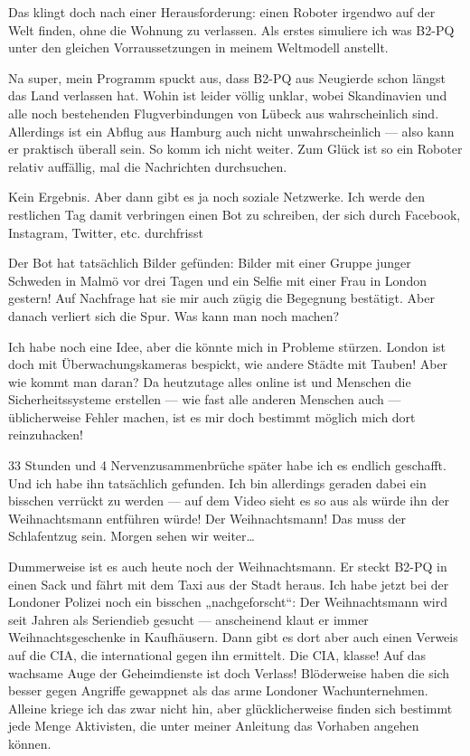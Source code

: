 Das klingt doch nach einer Herausforderung: einen Roboter irgendwo auf der Welt finden, ohne die Wohnung zu verlassen. Als erstes simuliere ich was B2-PQ unter den gleichen Vorraussetzungen in meinem Weltmodell anstellt.

Na super, mein Programm spuckt aus, dass B2-PQ aus Neugierde schon längst das Land verlassen hat. Wohin ist leider völlig unklar, wobei Skandinavien und alle noch bestehenden Flugverbindungen von Lübeck aus wahrscheinlich sind. Allerdings ist ein Abflug aus Hamburg auch nicht unwahrscheinlich — also kann er praktisch überall sein. So komm ich nicht weiter. Zum Glück ist so ein Roboter relativ auffällig, mal die Nachrichten durchsuchen.

Kein Ergebnis. Aber dann gibt es ja noch soziale Netzwerke. Ich werde den restlichen Tag damit verbringen einen Bot %
zu schreiben, der sich durch Facebook, Instagram, Twitter, etc. durchfrisst %

Der Bot hat tatsächlich Bilder gefünden: Bilder mit einer Gruppe junger Schweden in Malmö vor drei Tagen und ein Selfie mit einer Frau in London gestern! Auf Nachfrage hat sie mir auch zügig die Begegnung bestätigt. Aber danach verliert sich die Spur. Was kann man noch machen?

Ich habe noch eine Idee, aber die könnte mich in Probleme stürzen. London ist doch mit Überwachungskameras bespickt, wie andere Städte mit Tauben! Aber wie kommt man daran? Da heutzutage alles online ist und Menschen die Sicherheitssysteme erstellen — wie fast alle anderen Menschen auch — üblicherweise Fehler machen, ist es mir doch bestimmt möglich mich dort reinzuhacken!

33 Stunden und 4 Nervenzusammenbrüche später habe ich es endlich geschafft. Und ich habe ihn tatsächlich gefunden. Ich bin allerdings geraden dabei ein bisschen verrückt zu werden — auf dem Video sieht es so aus als würde ihn der Weihnachtsmann entführen würde! Der Weihnachtsmann! Das muss der Schlafentzug sein. Morgen sehen wir weiter…

Dummerweise ist es auch heute noch der Weihnachtsmann. Er steckt B2-PQ in einen Sack und fährt mit dem Taxi aus der Stadt heraus. Ich habe jetzt bei der Londoner Polizei noch ein bisschen „nachgeforscht“: Der Weihnachtsmann wird seit Jahren als Seriendieb gesucht — anscheinend klaut er immer Weihnachtsgeschenke in Kaufhäusern. Dann gibt es dort aber auch einen Verweis auf die CIA, die international gegen ihn ermittelt. Die CIA, klasse! Auf das wachsame Auge der Geheimdienste ist doch Verlass! Blöderweise haben die sich besser gegen Angriffe gewappnet als das arme Londoner Wachunternehmen. Alleine kriege ich das zwar nicht hin, aber glücklicherweise finden sich bestimmt jede Menge Aktivisten, die unter meiner Anleitung das Vorhaben angehen können.

